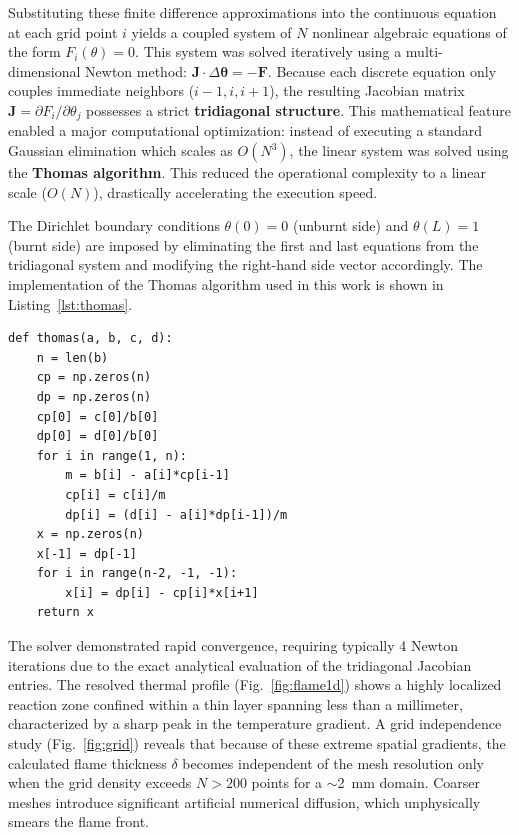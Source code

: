 \documentclass[11pt,a4paper]{article}
\begin{document}
Substituting these finite difference approximations into the continuous equation at each grid point $i$ yields a coupled system of $N$ nonlinear algebraic equations of the form $F_i(\theta) = 0$. This system was solved iteratively using a multi-dimensional Newton method: $\bm{J} \cdot \Delta \bm{\theta} = -\bm{F}$. Because each discrete equation only couples immediate neighbors ($i-1, i, i+1$), the resulting Jacobian matrix $\bm{J} = \partial F_i/\partial \theta_j$ possesses a strict \textbf{tridiagonal structure}. This mathematical feature enabled a major computational optimization: instead of executing a standard Gaussian elimination which scales as $O(N^3)$, the linear system was solved using the \textbf{Thomas algorithm}. This reduced the operational complexity to a linear scale ($O(N)$), drastically accelerating the execution speed.

The Dirichlet boundary conditions $\theta(0)=0$ (unburnt side) and $\theta(L)=1$ (burnt side) are imposed by eliminating the first and last equations from the tridiagonal system and modifying the right-hand side vector accordingly. The implementation of the Thomas algorithm used in this work is shown in Listing~\ref{lst:thomas}.

\begin{lstlisting}[caption={Thomas algorithm for tridiagonal systems}, label={lst:thomas}]
def thomas(a, b, c, d):
    n = len(b)
    cp = np.zeros(n)
    dp = np.zeros(n)
    cp[0] = c[0]/b[0]
    dp[0] = d[0]/b[0]
    for i in range(1, n):
        m = b[i] - a[i]*cp[i-1]
        cp[i] = c[i]/m
        dp[i] = (d[i] - a[i]*dp[i-1])/m
    x = np.zeros(n)
    x[-1] = dp[-1]
    for i in range(n-2, -1, -1):
        x[i] = dp[i] - cp[i]*x[i+1]
    return x
\end{lstlisting}

The solver demonstrated rapid convergence, requiring typically 4 Newton iterations due to the exact analytical evaluation of the tridiagonal Jacobian entries. The resolved thermal profile (Fig.~\ref{fig:flame1d}) shows a highly localized reaction zone confined within a thin layer spanning less than a millimeter, characterized by a sharp peak in the temperature gradient. A grid independence study (Fig.~\ref{fig:grid}) reveals that because of these extreme spatial gradients, the calculated flame thickness $\delta$ becomes independent of the mesh resolution only when the grid density exceeds $N > 200$ points for a $\sim$2~mm domain. Coarser meshes introduce significant artificial numerical diffusion, which unphysically smears the flame front.
\end{document}
